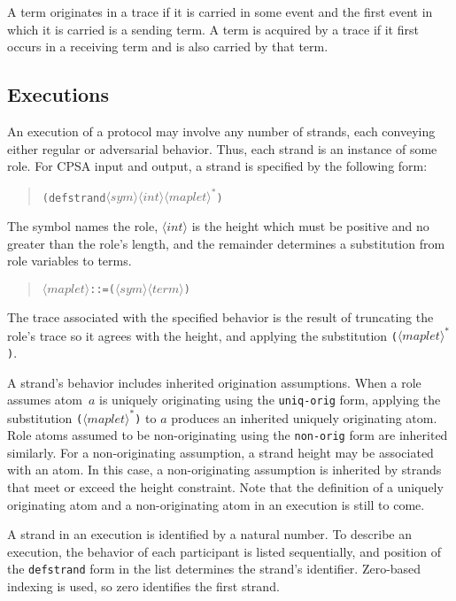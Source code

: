 \documentclass[titlepage,12pt]{article}
\theoremstyle{definition}
\newcommand{\nterm}[1]{\ensuremath{\langle\mathit{#1}\rangle}}
\newcommand{\nterms}[1]{\ensuremath{\nterm{#1}^\ast}}
\begin{document}
A term originates in a trace if it is carried in some event
and the first event in which it is carried is a sending term.
A term is acquired by a trace if it first occurs in a receiving term
and is also carried by that term.

\subsection{Executions}

An execution of a protocol may involve any number of strands, each
conveying either regular or adversarial behavior.  Thus, each strand
is an instance of some role.  For CPSA input and output, a strand is
specified by the following form:
\begin{quote}
\begin{alltt}
(defstrand \nterm{sym} \nterm{int} \nterms{maplet})
\end{alltt}
\end{quote}
The symbol names the role, \nterm{int} is the height which must be
positive and no greater than the role's length, and the remainder
determines a substitution from role variables to terms.
\begin{quote}
\begin{alltt}
\nterm{maplet} ::= (\nterm{sym} \nterm{term})
\end{alltt}
\end{quote}
The trace associated with the specified behavior is the result of
truncating the role's trace so it agrees with the height, and applying
the substitution \texttt{(\nterms{maplet})}.

A strand's behavior includes inherited origination assumptions.  When
a role assumes atom~$a$ is uniquely originating using the
\texttt{uniq-orig} form, applying the substitution
\texttt{(\nterms{maplet})} to $a$ produces an inherited uniquely
originating atom.  Role atoms assumed to be non-originating using the
\texttt{non-orig} form are inherited similarly.  For a non-originating
assumption, a strand height may be associated with an atom.  In this
case, a non-originating assumption is inherited by strands that meet
or exceed the height constraint.  Note that the definition of a
uniquely originating atom and a non-originating atom in an execution
is still to come.

A strand in an execution is identified by a natural number.  To
describe an execution, the behavior of each participant is listed
sequentially, and position of the \texttt{defstrand} form in the list
determines the strand's identifier.  Zero-based indexing is used,
so zero identifies the first strand.
\end{document}
